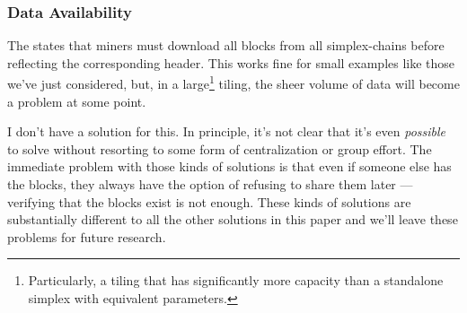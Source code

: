 






\subsubsection{Data Availability}

\label{sec:tiling-data-availability}

The \AxiomOfAvailability{} states that miners must download all blocks from all simplex-chains before reflecting the corresponding header.
This works fine for small examples like those we've just considered, but, in a large\footnote{
    Particularly, a tiling that has significantly more capacity than a standalone simplex with equivalent parameters.
} tiling, the sheer volume of data will become a problem at some point.

I don't have a solution for this.
In principle, it's not clear that it's even \emph{possible} to solve without resorting to some form of centralization or group effort.
The immediate problem with those kinds of solutions is that even if someone else has the blocks, they always have the option of refusing to share them later --- verifying that the blocks exist is not enough.
These kinds of solutions are substantially different to all the other solutions in this paper and we'll leave these problems for future research.

